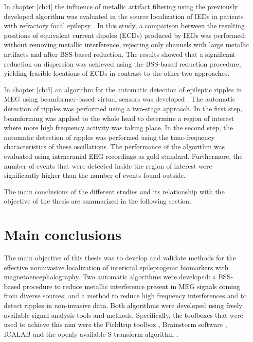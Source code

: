 In chapter \ref{ch:4} the influence of metallic artifact filtering using the previously developed algorithm was evaluated in the source localization of IEDs in patients with refractory focal epilepsy \citep{Migliorelli2016}. In this study, a comparison between the resulting positions of equivalent current dipoles (ECDs) produced by IEDs was performed: without removing metallic interference, rejecting only channels with large metallic artifacts and after BSS-based reduction. The results showed that a significant reduction on dispersion was achieved using the BSS-based reduction procedure, yielding feasible locations of ECDs in contrast to the other two approaches. 

In chapter \ref{ch:5} an algorithm for the automatic detection of epileptic ripples in MEG using beamformer-based virtual sensors was developed \citep{Migliorelli2017}. The automatic detection of ripples was performed using a two-stage approach. In the first step, beamforming was applied to the whole head to determine a region of interest where more high frequency activity was taking place. In the second step, the automatic detection of ripples was performed using the time-frequency characteristics of these oscillations. The performance of the algorithm was evaluated using intracranial EEG recordings as gold standard. Furthermore, the number of events that were detected inside the region of interest were significantly higher than the number of events found outside. 

The main conclusions of the different studies and its relationship with the objective of the thesis are summarized in the following section.

\section{Main conclusions}

The main objective of this thesis was to develop and validate methods for the effective noninvasive localization of interictal epileptogenic biomarkers with magnetoencephalography. Two automatic algorithms were developed: a BSS-based procedure to reduce metallic interference present in MEG signals coming from diverse sources; and a method to reduce high frequency interferences and to detect ripples in non-invasive data. Both algorithms were developed using freely available signal analysis tools and methods. Specifically, the toolboxes that were used to achieve this aim were the Fieldtrip toolbox \citep{Oostenveld2011}, Brainstorm software \citep{Tadel2011}, ICALAB \citep{Cichocki2003} and the openly-available S-transform algorithm \citep{Stockwell1996}. 

